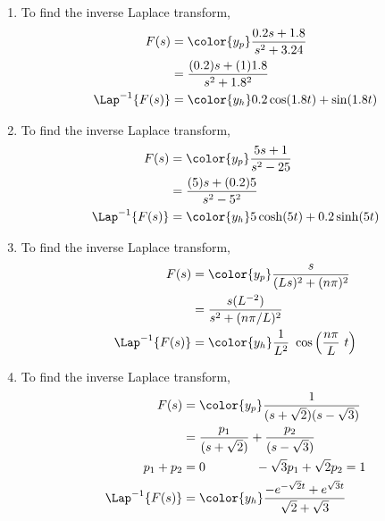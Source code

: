 \begin{enumerate}
      \item To find the inverse Laplace transform,
            \begin{align}
                  F(s)              & = \color{y_p} \frac{0.2s + 1.8}{s^2 + 3.24} \\
                                    & = \frac{(0.2)s + (1)1.8}{s^2 + 1.8^2}       \\
                  \Lap^{-1}\{F(s)\} & = \color{y_h} 0.2\cos(1.8 t) + \sin(1.8 t)
            \end{align}

      \item To find the inverse Laplace transform,
            \begin{align}
                  F(s)              & = \color{y_p} \frac{5s + 1}{s^2 - 25}   \\
                                    & = \frac{(5)s + (0.2)5}{s^2 - 5^2}       \\
                  \Lap^{-1}\{F(s)\} & = \color{y_h} 5\cosh(5t) + 0.2\sinh(5t)
            \end{align}

      \item To find the inverse Laplace transform,
            \begin{align}
                  F(s)              & = \color{y_p} \frac{s}{(Ls)^2 + (n\pi)^2} \\
                                    & = \frac{s(L^{-2})}{s^2 + (n\pi/L)^2}      \\
                  \Lap^{-1}\{F(s)\} & = \color{y_h} \frac{1}{L^2}\ \cos\left(
                  \frac{n\pi}{L}\ t \right)
            \end{align}

      \item To find the inverse Laplace transform,
            \begin{align}
                  F(s)              & = \color{y_p} \frac{1}{(s+\sqrt{2})(s-\sqrt{3})} \\
                                    & = \frac{p_1}{(s+\sqrt{2})}
                  + \frac{p_2}{(s-\sqrt{3})}                                           \\
                  p_1 + p_2         & = 0 \qquad\qquad -\sqrt{3}p_1 + \sqrt{2}p_2 = 1  \\
                  \Lap^{-1}\{F(s)\} & = \color{y_h} \frac{-e^{-\sqrt{2}t}
                  + e^{\sqrt{3}t}}{\sqrt{2}+\sqrt{3}}
            \end{align}


\end{enumerate}
